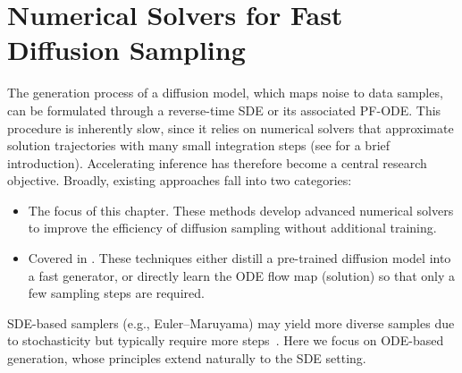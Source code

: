 \chapter{Numerical Solvers for Fast Diffusion Sampling}\label{ch:solvers}


The generation process of a diffusion model, which maps noise to data samples, can be formulated through a reverse-time SDE or its
associated PF-ODE. This procedure is inherently slow, since it relies on numerical solvers that approximate solution trajectories with many small integration steps (see  for a brief introduction). Accelerating inference has therefore become a central research objective. Broadly, existing approaches fall into two categories:
\begin{itemize}
    \item {} The focus of this chapter. These methods develop advanced numerical solvers to improve the efficiency of diffusion sampling without additional training.
    \item {} Covered in . These techniques either distill a pre-trained diffusion model into a fast generator, or directly learn the ODE flow map (solution) so that only a few sampling steps are required.
\end{itemize}
SDE-based samplers (e.g., Euler--Maruyama) may yield more diverse samples due to stochasticity but typically require more steps~\citep{xu2023restart}. Here we focus on ODE-based generation, whose principles extend naturally to the SDE setting.



